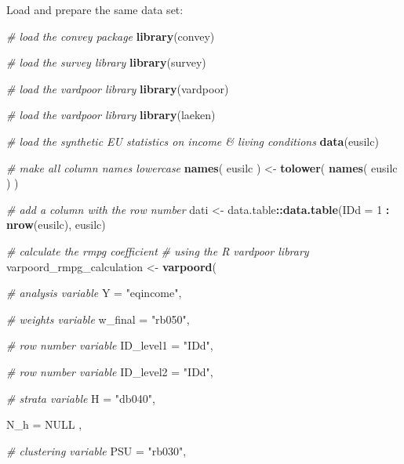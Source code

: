 \documentclass[]{book}
\newenvironment{Shaded}{\begin{snugshade}}{\end{snugshade}}
\newcommand{\CommentTok}[1]{\textcolor[rgb]{0.56,0.35,0.01}{\textit{#1}}}
\newcommand{\DataTypeTok}[1]{\textcolor[rgb]{0.13,0.29,0.53}{#1}}
\newcommand{\DecValTok}[1]{\textcolor[rgb]{0.00,0.00,0.81}{#1}}
\newcommand{\KeywordTok}[1]{\textcolor[rgb]{0.13,0.29,0.53}{\textbf{#1}}}
\newcommand{\NormalTok}[1]{#1}
\newcommand{\OperatorTok}[1]{\textcolor[rgb]{0.81,0.36,0.00}{\textbf{#1}}}
\newcommand{\OtherTok}[1]{\textcolor[rgb]{0.56,0.35,0.01}{#1}}
\newcommand{\StringTok}[1]{\textcolor[rgb]{0.31,0.60,0.02}{#1}}
\begin{document}
Load and prepare the same data set:

\begin{Shaded}
\begin{Highlighting}[]
\CommentTok{# load the convey package}
\KeywordTok{library}\NormalTok{(convey)}

\CommentTok{# load the survey library}
\KeywordTok{library}\NormalTok{(survey)}

\CommentTok{# load the vardpoor library}
\KeywordTok{library}\NormalTok{(vardpoor)}

\CommentTok{# load the vardpoor library}
\KeywordTok{library}\NormalTok{(laeken)}

\CommentTok{# load the synthetic EU statistics on income & living conditions}
\KeywordTok{data}\NormalTok{(eusilc)}

\CommentTok{# make all column names lowercase}
\KeywordTok{names}\NormalTok{( eusilc ) <-}\StringTok{ }\KeywordTok{tolower}\NormalTok{( }\KeywordTok{names}\NormalTok{( eusilc ) )}

\CommentTok{# add a column with the row number}
\NormalTok{dati <-}\StringTok{ }\NormalTok{data.table}\OperatorTok{::}\KeywordTok{data.table}\NormalTok{(}\DataTypeTok{IDd =} \DecValTok{1} \OperatorTok{:}\StringTok{ }\KeywordTok{nrow}\NormalTok{(eusilc), eusilc)}

\CommentTok{# calculate the rmpg coefficient}
\CommentTok{# using the R vardpoor library}
\NormalTok{varpoord_rmpg_calculation <-}
\StringTok{    }\KeywordTok{varpoord}\NormalTok{(}
    
        \CommentTok{# analysis variable}
        \DataTypeTok{Y =} \StringTok{"eqincome"}\NormalTok{, }
        
        \CommentTok{# weights variable}
        \DataTypeTok{w_final =} \StringTok{"rb050"}\NormalTok{,}
        
        \CommentTok{# row number variable}
        \DataTypeTok{ID_level1 =} \StringTok{"IDd"}\NormalTok{,}

        \CommentTok{# row number variable}
        \DataTypeTok{ID_level2 =} \StringTok{"IDd"}\NormalTok{,}
                
        \CommentTok{# strata variable}
        \DataTypeTok{H =} \StringTok{"db040"}\NormalTok{, }
        
        \DataTypeTok{N_h =} \OtherTok{NULL}\NormalTok{ ,}
        
        \CommentTok{# clustering variable}
        \DataTypeTok{PSU =} \StringTok{"rb030"}\NormalTok{, }
        

\end{Highlighting}
\end{Shaded}
\end{document}
